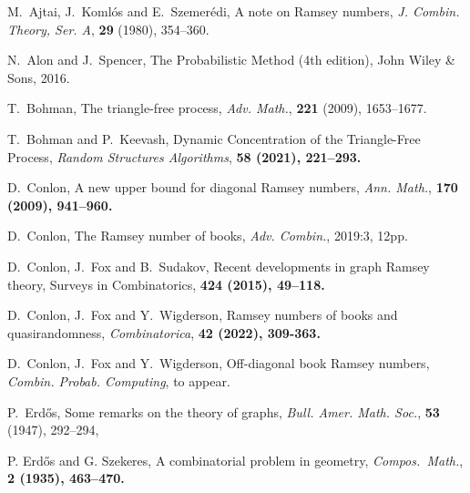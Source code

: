 \documentclass[12pt,reqno]{amsart}
\theoremstyle{definition}
\theoremstyle{remark}
\begin{document}
\begin{thebibliography}{9}


 M.~Ajtai, J.~Koml\'os and E.~Szemer\'edi, A note on Ramsey numbers, \emph{J. Combin. Theory, Ser. A}, \textbf{29} (1980), 354--360.

 N.~Alon and J.~Spencer, The Probabilistic Method (4th edition), John Wiley \& Sons, 2016.

 T.~Bohman, The triangle-free process, \emph{Adv. Math.}, \textbf{221} (2009), 1653--1677.


 T.~Bohman and P.~Keevash, Dynamic Concentration of the Triangle-Free Process, 
\emph{Random Structures Algorithms}, \bf 58 \rm (2021), 221--293.


 D.~Conlon, 
A new upper bound for diagonal Ramsey numbers, 
\emph{Ann. Math.},  \bf 170 \rm (2009), 941--960.

 D.~Conlon, 
The Ramsey number of books, 
\emph{Adv. Combin.}, 2019:3, 12pp.


 D.~Conlon, J.~Fox and B.~Sudakov, 
Recent developments in graph Ramsey theory, 
Surveys in Combinatorics, \bf 424 \rm (2015), 49--118.

 D.~Conlon, J.~Fox and Y.~Wigderson, 
Ramsey numbers of books and quasirandomness, 
\emph{Combinatorica}, \bf 42 \rm (2022), 309-363.

 D.~Conlon, J.~Fox and Y.~Wigderson, 
Off-diagonal book Ramsey numbers, 
\emph{Combin. Probab. Computing}, to appear.

 P.~Erd\H{o}s, Some remarks on the theory of graphs, \emph{Bull. Amer. Math. Soc.}, \textbf{53} (1947), 292--294,

 P. Erd\H{o}s and G. Szekeres, 
A combinatorial problem in geometry, 
\emph{Compos.~Math.}, \bf 2 \rm (1935), 463--470.



\end{thebibliography}
\end{document}
